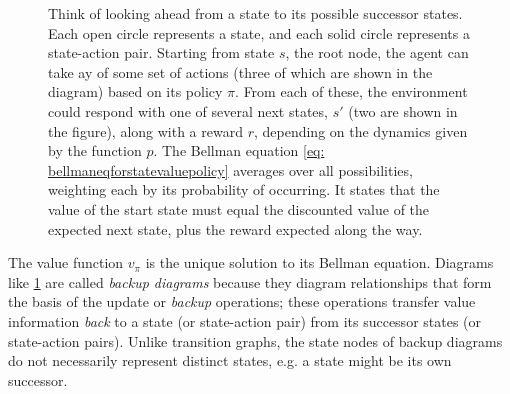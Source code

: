 \documentclass[12pt]{article}
\begin{document}
\begin{figure}[h]
  \centering
\caption{\footnotesize Think of looking ahead from a state to its possible successor states. Each open circle represents a state, and each solid circle represents a state-action pair. Starting from state $s$, the root node, the agent can take ay of some set of actions (three of which are shown in the diagram) based on its policy $\pi$. From each of these, the environment could respond with one of several next states, $s'$ (two are shown in the figure), along with a reward $r$, depending on the dynamics given by the function $p$. The Bellman equation \ref{eq: bellmaneqforstatevaluepolicy} averages over all possibilities, weighting each by its probability of occurring. It states that the value of the start state must equal the discounted value of the expected next state, plus the reward expected along the way.}
\label{fig: bellmanlookahead}
\end{figure}
The value function $v_\pi$ is the unique solution to its Bellman equation. Diagrams like \ref{fig: bellmanlookahead} are called \emph{backup diagrams} because they diagram relationships that form the basis of the update or \emph{backup} operations; these operations transfer value information \emph{back} to a state (or state-action pair) from its successor states (or state-action pairs). Unlike transition graphs, the state nodes of backup diagrams do not necessarily represent distinct states, e.g. a state might be its own successor.
\end{document}
